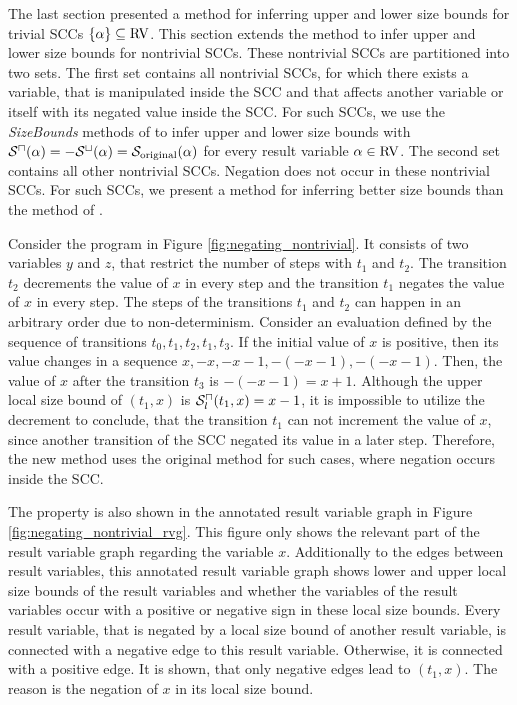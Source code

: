 The last section presented a method for inferring upper and lower size bounds for trivial SCCs $\lbrace \alpha \rbrace \subseteq \text{RV}$.
This section extends the method to infer upper and lower size bounds for nontrivial SCCs.
These nontrivial SCCs are partitioned into two sets.
The first set contains all nontrivial SCCs, for which there exists a variable, that is manipulated inside the SCC and that affects another variable or itself with its negated value inside the SCC.
For such SCCs, we use the \emph{SizeBounds} methods of \cite{koat} to infer upper and lower size bounds with ${\mathcal{S}^\sqcap}(\alpha) = -{\mathcal{S}^\sqcup}(\alpha) = \mathcal{S}_{\text{original}}(\alpha)$ for every result variable $\alpha \in \text{RV}$.
The second set contains all other nontrivial SCCs.
Negation does not occur in these nontrivial SCCs.
For such SCCs, we present a method for inferring better size bounds than the method of \cite{koat}.

\begin{example}
  
  Consider the program in Figure \ref{fig:negating_nontrivial}.
  It consists of two variables $y$ and $z$, that restrict the number of steps with $t_1$ and $t_2$.
  The transition $t_2$ decrements the value of $x$ in every step and the transition $t_1$ negates the value of $x$ in every step.
  The steps of the transitions $t_1$ and $t_2$ can happen in an arbitrary order due to non-determinism.
  Consider an evaluation defined by the sequence of transitions $t_0, t_1, t_2, t_1, t_3$.
  If the initial value of $x$ is positive, then its value changes in a sequence $x, -x, -x-1, -(-x-1), -(-x-1)$.
  Then, the value of $x$ after the transition $t_3$ is $-(-x-1) = x+1$.
  Although the upper local size bound of $(t_1,x)$ is ${\mathcal{S}^\sqcap_l}(t_1,x) = x-1$, it is impossible to utilize the decrement to conclude, that the transition $t_1$ can not increment the value of $x$, since another transition of the SCC negated its value in a later step.
  Therefore, the new method uses the original method for such cases, where negation occurs inside the SCC.

  

  The property is also shown in the annotated result variable graph in Figure \ref{fig:negating_nontrivial_rvg}.
  This figure only shows the relevant part of the result variable graph regarding the variable $x$.
  Additionally to the edges between result variables, this annotated result variable graph shows lower and upper local size bounds of the result variables and whether the variables of the result variables occur with a positive or negative sign in these local size bounds.
  Every result variable, that is negated by a local size bound of another result variable, is connected with a negative edge to this result variable.
  Otherwise, it is connected with a positive edge.
  It is shown, that only negative edges lead to $(t_1,x)$.
  The reason is the negation of $x$ in its local size bound.
\end{example}

